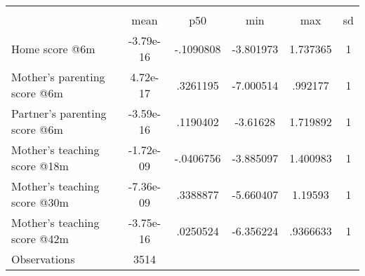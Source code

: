{
\def\sym#1{\ifmmode^{#1}\else\(^{#1}\)\fi}
\begin{tabular}{l*{1}{ccccc}}
\toprule
                    &\multicolumn{5}{c}{}                                            \\
                    &        mean&         p50&         min&         max&          sd\\
\midrule
Home score @6m      &   -3.79e-16&   -.1090808&   -3.801973&    1.737365&           1\\
Mother's parenting score @6m&    4.72e-17&    .3261195&   -7.000514&     .992177&           1\\
Partner's parenting score @6m&   -3.59e-16&    .1190402&    -3.61628&    1.719892&           1\\
Mother's teaching score @18m&   -1.72e-09&   -.0406756&   -3.885097&    1.400983&           1\\
Mother's teaching score @30m&   -7.36e-09&    .3388877&   -5.660407&     1.19593&           1\\
Mother's teaching score @42m&   -3.75e-16&    .0250524&   -6.356224&    .9366633&           1\\
\midrule
Observations        &        3514&            &            &            &            \\
\bottomrule
\end{tabular}
}
